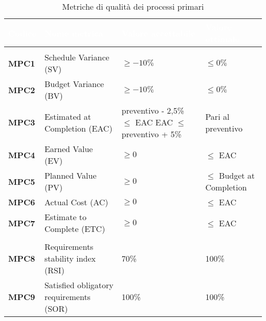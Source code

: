 {
\renewcommand{\arraystretch}{1.5}
\centering
\begin{longtable}{C{2.5cm} | C{4cm} | C{5cm} | C{3.5cm}}
\textcolor{white}{\textbf{Codice}}&
\textcolor{white}{\textbf{Nome metrica}}&
\textcolor{white}{\textbf{Valore accettabile}}&
\textcolor{white}{\textbf{Valore ottimale}}\\	

\endhead
\endfoot

\caption{Metriche di qualità dei processi primari}
\endlastfoot

 \\

\textbf{MPC1} & Schedule Variance (SV) & $\geq -10\%$ & $\leq 0\%$ \\
\textbf{MPC2} & Budget Variance (BV) & $\geq -10\%$ & $\leq 0\%$ \\
\textbf{MPC3} & Estimated at Completion (EAC) & preventivo - 2,5\% $ \leq $ EAC \newline EAC $ \leq $ preventivo + 5\% & Pari al preventivo  \\
\textbf{MPC4} & Earned Value (EV) & $\geq 0$  & $\leq $ EAC \\
\textbf{MPC5} & Planned Value (PV) & $\geq 0$  & $\leq $ Budget at Completion\\
\textbf{MPC6} & Actual Cost (AC) & $\geq 0$  & $\leq $ EAC\\
\textbf{MPC7} & Estimate to Complete (ETC) & $\geq 0$  & $\leq $ EAC\\

 \\

\textbf{MPC8} & Requirements stability index (RSI) & 70\% & 100\% \\
\textbf{MPC9} & Satisfied obligatory requirements (SOR) & 100\% & 100\%
\end{longtable}
}


